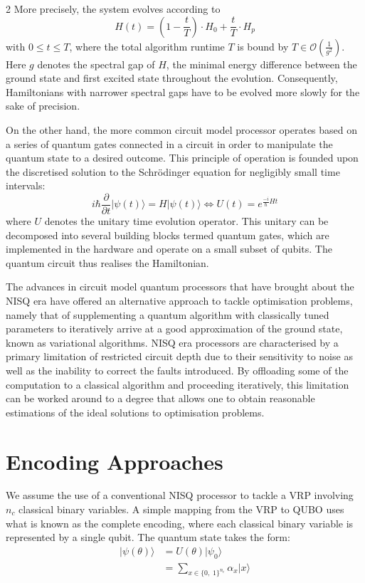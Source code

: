 \documentclass [10pt]{article}
\newcommand {\qvec}[1] {\vert #1 \rangle}
\begin{document}
\begin {multicols}{2}
More precisely, the system evolves according to
\begin {equation}
H(t) = \left(1 - \frac{t}{T}\right) \cdot H_0 + \frac{t}{T} \cdot H_p
\end {equation}
with $0 \leq t \leq T$, where the total algorithm runtime $T$ is bound by
$T \in \mathcal{O}(\frac{1}{g^2})$. Here $g$ denotes the spectral gap of $H$,
the minimal energy difference between the ground state and first excited
state throughout the evolution. Consequently, Hamiltonians with narrower
spectral gaps have to be evolved more slowly for the sake of precision.

On the other hand, the more common circuit model processor operates based on a
series of quantum gates connected in a circuit in order to manipulate the
quantum state to a desired outcome. This principle of operation is founded
upon the discretised solution to the Schrödinger equation for negligibly small
time intervals:
\begin {equation}
i \hbar \frac{\partial}{\partial t} \qvec{\psi(t)} = H \qvec{\psi(t)}
\Longleftrightarrow
U(t) = e^{\frac{-i}{\hbar}Ht}
\end {equation}
where $U$ denotes the unitary time evolution operator. This unitary can be
decomposed into several building blocks termed quantum gates, which are
implemented in the hardware and operate on a small subset of qubits. The
quantum circuit thus realises the Hamiltonian.

The advances in circuit model quantum processors that have brought
about the NISQ era have offered an alternative approach to tackle optimisation
problems, namely that of supplementing a quantum algorithm with classically
tuned parameters to iteratively arrive at a good approximation of the ground
state, known as variational algorithms. NISQ era processors are characterised
by a primary limitation of restricted circuit depth due to their sensitivity
to noise as well as the inability to correct the faults introduced. By
offloading some of the computation to a classical algorithm and proceeding
iteratively, this limitation can be worked around to a degree that allows
one to obtain reasonable estimations of the ideal solutions to optimisation
problems.


\section {Encoding Approaches}
We assume the use of a conventional NISQ processor to tackle a VRP involving
$n_c$ classical binary variables. A simple mapping from the VRP to QUBO uses
what is known as the complete encoding, where each classical binary variable
is represented by a single qubit. The quantum state takes the form:
\begin {align}
\qvec{\psi(\theta)} 
&= U(\theta)\qvec{\psi_0} \\
&= \sum_{x \in \{0, \; 1\}^{n_c}} \alpha_x \qvec{x}
\end {align}


\end{multicols}
\end{document}
